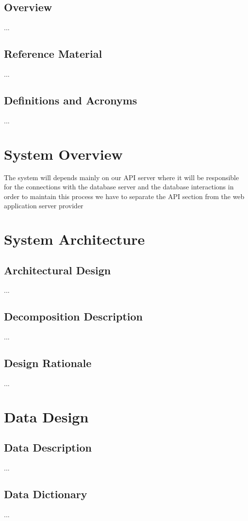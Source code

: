 \documentclass[]{article}
\begin{document}
\subsection{Overview}
...



\subsection{Reference Material}
... 


\subsection{Definitions and Acronyms}
...

\section{System Overview}
The system will depends mainly on our API server where it will be responsible for the connections with the database server and the database interactions in order to maintain this process we have to separate the API section from the web application server provider   

\section{System Architecture}
\subsection{Architectural Design}
...


\subsection{Decomposition Description}
...


\subsection{Design Rationale}
...


\section{Data Design}
\subsection{Data Description}
...

\subsection {Data Dictionary}
...
\end{document}
